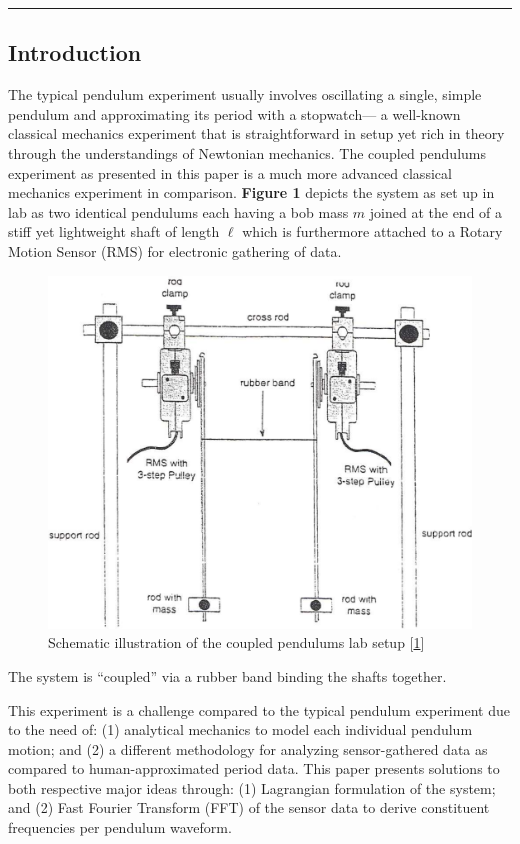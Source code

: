 \documentclass[12pt]{article}
\begin{document}
\noindent\rule{\linewidth}{0.5pt}

\begin{multicols}{2}

\subsection{Introduction}
The typical pendulum experiment usually involves oscillating a single, simple pendulum
and approximating its period with a stopwatch--- a well-known classical mechanics experiment
that is straightforward in setup yet rich in theory through the understandings of Newtonian mechanics.
The coupled pendulums experiment as presented in this paper is a much more advanced classical mechanics experiment
in comparison. \textbf{Figure 1} depicts the system as set up in lab as two identical pendulums each having
a bob mass $m$ joined at the end of a stiff yet lightweight shaft of length $\ell$ which is furthermore attached
to a Rotary Motion Sensor (RMS) for electronic gathering of data. 
\columnbreak
\begin{figure}[H]
    \centering
    \includegraphics[width=0.95\linewidth]{figs/fig1_cropped.png}
    \caption{Schematic illustration of the coupled pendulums lab setup [\hyperref[sec:1]{1}]}
    \label{fig:1}
\end{figure}
\noindent
The system is ``coupled'' via a rubber band binding the shafts together.

This experiment is a challenge compared to the typical pendulum experiment due to the
need of: (1) analytical mechanics to model each individual pendulum motion; and (2) a different methodology for analyzing
sensor-gathered data as compared to human-approximated period data.
This paper presents solutions to both respective major ideas through: (1) Lagrangian formulation of the system;
and (2) Fast Fourier Transform (FFT) of the sensor data to derive constituent frequencies per pendulum waveform.


\end{multicols}
\end{document}
